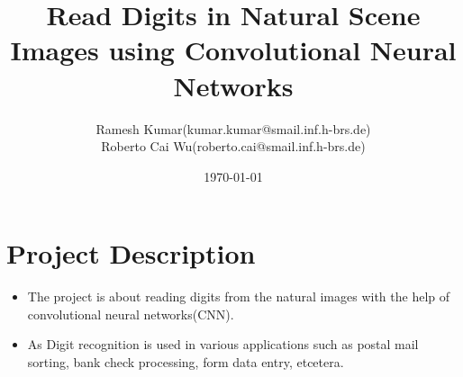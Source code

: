 \documentclass[12pt, letterpaper]{article}
\title{Read Digits in Natural Scene Images using Convolutional Neural Networks }
\author{Ramesh Kumar(kumar.kumar@smail.inf.h-brs.de) \\ Roberto Cai Wu(roberto.cai@smail.inf.h-brs.de)}
\date{\today}
\begin{document}
\begin{titlepage}
\maketitle
\end{titlepage}

\section{Project Description}

	\begin{itemize}
		\item The project is about reading digits from the natural images with the help
		of convolutional neural networks(CNN).
			\item As Digit recognition is used in various applications such as postal mail sorting, bank check processing, form data entry, etcetera. 
\end{itemize}



\end{document}
